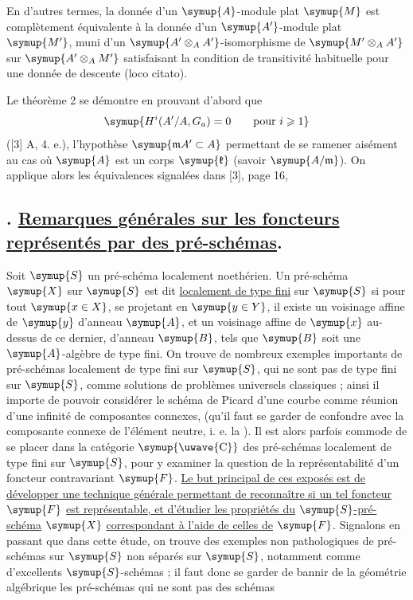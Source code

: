 En d'autres termes, la donnée d'un $\symup{A}$-module plat $\symup{M}$ est complètement
équivalente à la donnée d'un $\symup{A'}$-module plat $\symup{M'}$, muni d'un
$\symup{A'\otimes_AA'}$-isomorphisme de $\symup{M'\otimes_AA'}$ sur $\symup{A'\otimes_AM'}$
satisfaisant la condition de transitivité habituelle pour une donnée de
descente (loco citato).

Le théorème 2 se démontre en prouvant d'abord que
\[
  \symup{H^i(A'/A,G_a)=0\qquad\text{pour }i\geqslant 1}
\]
([3] A, 4. e.), l'hypothèse $\symup{\mathfrak mA'\subset A}$ permettant de se ramener
aisément au cas où $\symup{A}$ est un corps $\symup{\mathfrak k}$ (savoir $\symup{A/\mathfrak m}$). On applique
alors les équivalences signalées dans [3], page 16,


\subsection*{. \uline{Remarques générales sur les foncteurs représentés par des pré-schémas}.}

Soit $\symup{S}$ un pré-schéma localement noethérien. Un pré-schéma $\symup{X}$ sur $\symup{S}$ est dit
\uline{localement de type fini} sur $\symup{S}$ si pour tout $\symup{x\in X}$, se projetant en
$\symup{y\in Y}$, il existe un
voisinage affine de $\symup{y}$ d'anneau $\symup{A}$, et un voisinage affine de $\symup{x}$ au-dessus
de ce dernier, d'anneau $\symup{B}$, tels que $\symup{B}$ soit une $\symup{A}$-algèbre de type fini.
On trouve de nombreux exemples importants de pré-schémas localement de type
fini sur $\symup{S}$, qui ne sont pas de type fini sur $\symup{S}$, comme solutions de
problèmes universels classiques ; ainsi il importe de pouvoir considérer le
schéma de Picard d'une courbe comme réunion d'une infinité de composantes
connexes, (qu'il faut se garder de confondre avec la composante connexe de
l'élément neutre, i. e. la ). Il est alors parfois commode
de se placer dans la catégorie $\symup{\text{\uwave{C}}}$ des pré-schémas localement de type
fini sur $\symup{S}$, pour y examiner la question de la représentabilité d'un foncteur
contravariant $\symup{F}$. \uline{Le but principal de ces exposés est de développer une
technique générale permettant de reconnaître si un tel foncteur} $\symup{F}$ \uline{est
représentable, et d'étudier les propriétés du} $\symup{S}$\uline{-pré-schéma} $\symup{X}$ \uline{correspondant
à l'aide de celles de} $\symup{F}$. Signalons en passant que dans cette étude, on
trouve des exemples non pathologiques de pré-schémas sur $\symup{S}$ non séparés sur
$\symup{S}$, notamment comme  d'excellents $\symup{S}$-schémas ; il
faut donc se garder de bannir de la géométrie algébrique les pré-schémas qui ne
sont pas des schémas

